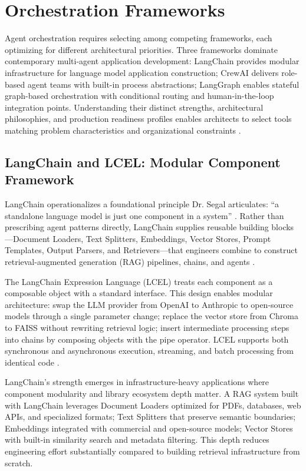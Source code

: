 \chapter{Orchestration Frameworks}\label{ch:frameworks}

Agent orchestration requires selecting among competing frameworks, each optimizing for different architectural priorities. Three frameworks dominate contemporary multi-agent application development: LangChain provides modular infrastructure for language model application construction; CrewAI delivers role-based agent teams with built-in process abstractions; LangGraph enables stateful graph-based orchestration with conditional routing and human-in-the-loop integration points. Understanding their distinct strengths, architectural philosophies, and production readiness profiles enables architects to select tools matching problem characteristics and organizational constraints \cite{Segal2026}.

\section{LangChain and LCEL: Modular Component Framework}

LangChain operationalizes a foundational principle Dr. Segal articulates: ``a standalone language model is just one component in a system'' \cite{Segal2026}. Rather than prescribing agent patterns directly, LangChain supplies reusable building blocks---Document Loaders, Text Splitters, Embeddings, Vector Stores, Prompt Templates, Output Parsers, and Retrievers---that engineers combine to construct retrieval-augmented generation (RAG) pipelines, chains, and agents \cite{LangChain2024a}.

The LangChain Expression Language (LCEL) treats each component as a composable object with a standard interface. This design enables modular architecture: swap the LLM provider from OpenAI to Anthropic to open-source models through a single parameter change; replace the vector store from Chroma to FAISS without rewriting retrieval logic; insert intermediate processing steps into chains by composing objects with the pipe operator. LCEL supports both synchronous and asynchronous execution, streaming, and batch processing from identical code \cite{LangChain2024a}.

LangChain's strength emerges in infrastructure-heavy applications where component modularity and library ecosystem depth matter. A RAG system built with LangChain leverages Document Loaders optimized for PDFs, databases, web APIs, and specialized formats; Text Splitters that preserve semantic boundaries; Embeddings integrated with commercial and open-source models; Vector Stores with built-in similarity search and metadata filtering. This depth reduces engineering effort substantially compared to building retrieval infrastructure from scratch.

